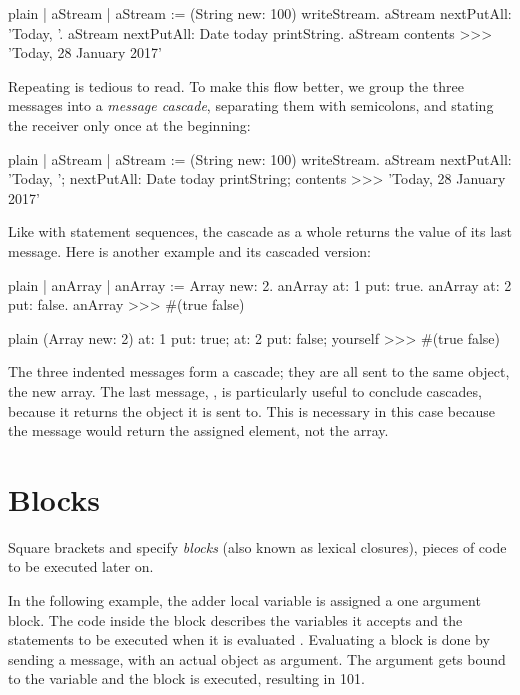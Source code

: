 \documentclass[10pt,twoside,english]{_support/latex/sbabook/sbabook}
\begin{document}
\begin{displaycode}{plain}
| aStream |
aStream := (String new: 100) writeStream.
aStream nextPutAll: 'Today, '.
aStream nextPutAll: Date today printString.
aStream contents
>>> 'Today, 28 January 2017'
\end{displaycode}

Repeating  is tedious to read.
To make this flow better, we group the three messages into a \textit{message cascade}, separating them with semicolons, and stating the receiver only once at the beginning:

\begin{displaycode}{plain}
| aStream |
aStream := (String new: 100) writeStream.
aStream 
	nextPutAll: 'Today, ';
	nextPutAll: Date today printString;
	contents
>>> 'Today, 28 January 2017'
\end{displaycode}

Like with statement sequences, the cascade as a whole returns the value of its last message.
Here is another example and its cascaded version:

\begin{displaycode}{plain}
| anArray |
anArray := Array new: 2. 
anArray at: 1 put: true.
anArray at: 2 put: false.
anArray
>>> #(true false)
\end{displaycode}

\begin{displaycode}{plain}
(Array new: 2)
	at: 1 put: true;
	at: 2 put: false;
	yourself
>>> #(true false)
\end{displaycode}

	
The three indented messages form a cascade; they are all sent to the same object, the new array.
The last message, , is particularly useful to conclude cascades, because it returns the object it is sent to.
This is necessary in this case because the  message would return the assigned element, not the array.
\section{Blocks}
Square brackets \textcode{{[}} and \textcode{{]}}  specify \textit{blocks} (also known as lexical closures), pieces of code to be executed later on.

In the following example, the adder local variable is assigned a one argument block. The code inside the block describes the variables it accepts  and the statements to be executed when it is evaluated . Evaluating a block is done by sending a message,  with an actual object as argument. The argument gets bound to the variable and the block is executed, resulting in 101.
\end{document}
